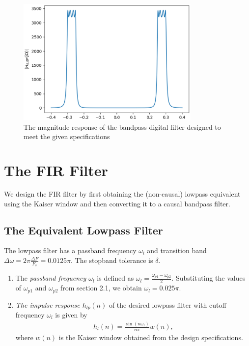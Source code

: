 \documentclass[journal,12pt,twocolumn]{IEEEtran}
\begin{document}
\begin{figure}
    \centering
    \includegraphics[width = 9cm]{./figs/iir/ee18btech11017_digital_bp.eps}
    \caption{The magnitude response of the bandpass digital filter designed to meet the given specifications}
    \label{fig:BP_digital}
\end{figure}
\section{The FIR Filter}
We design the FIR filter by first obtaining the (non-causal) lowpass equivalent using the Kaiser window
and then
converting it to a causal bandpass filter.

\subsection{The Equivalent Lowpass Filter}
The lowpass filter has a passband frequency $\omega_l$ and transition band $\Delta \omega = 2\pi \frac{\Delta F}{F_s} = 0.0125\pi$.
The stopband tolerance is $\delta$.
\begin{enumerate}
\item  The {\em passband frequency $\omega_l$}  is defined as $\omega_l = \frac{\omega_{p1} - \omega_{p2}}{2}$.  Substituting the values of $\omega_{p1}$ and $\omega_{p2}$ from section 2.1, we obtain $\omega_l = 0.025\pi$.

\item {\em The impulse response $h_{lp}(n)$} of the desired lowpass filter with cutoff frequency $\omega_l$
is given by
\begin{eqnarray}
\label{firlpdef}
h_l(n) = \frac{\sin(n\omega_l)}{n\pi}w(n),
\end{eqnarray}
where $w(n)$ is the Kaiser window obtained from the design specifications.
\end{enumerate}
\end{document}
